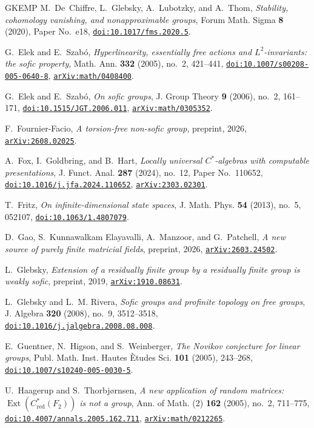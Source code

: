 \documentclass[11pt]{amsart}
\newcommand{\doi}[1]{\href{https://doi.org/#1}{\nolinkurl{doi:#1}}}
\newcommand{\arxiv}[1]{\href{https://arxiv.org/abs/#1}{\nolinkurl{arXiv:#1}}}
\theoremstyle{definition}
\theoremstyle{remark}
\theoremstyle{plain}
\begin{document}
\begin{thebibliography}{GKEMP}
M.~De~Chiffre, L.~Glebsky, A.~Lubotzky, and A.~Thom,
\emph{Stability, cohomology vanishing, and nonapproximable groups},
Forum Math. Sigma \textbf{8} (2020), Paper No.~e18,
\doi{10.1017/fms.2020.5}.

G.~Elek and E.~Szab\'o,
\emph{Hyperlinearity, essentially free actions and $L^2$-invariants:
the sofic property},
Math. Ann. \textbf{332} (2005), no.~2, 421--441,
\doi{10.1007/s00208-005-0640-8}, \arxiv{math/0408400}.

G.~Elek and E.~Szab\'o,
\emph{On sofic groups},
J. Group Theory \textbf{9} (2006), no.~2, 161--171,
\doi{10.1515/JGT.2006.011}, \arxiv{math/0305352}.

F.~Fournier-Facio,
\emph{A torsion-free non-sofic group},
preprint, 2026, \arxiv{2608.02025}.

A.~Fox, I.~Goldbring, and B.~Hart,
\emph{Locally universal $C^*$-algebras with computable presentations},
J. Funct. Anal. \textbf{287} (2024), no.~12, Paper No.~110652,
\doi{10.1016/j.jfa.2024.110652}, \arxiv{2303.02301}.

T.~Fritz,
\emph{On infinite-dimensional state spaces},
J. Math. Phys. \textbf{54} (2013), no.~5, 052107,
\doi{10.1063/1.4807079}.

D.~Gao, S.~Kunnawalkam Elayavalli, A.~Manzoor, and G.~Patchell,
\emph{A new source of purely finite matricial fields},
preprint, 2026, \arxiv{2603.24502}.

L.~Glebsky,
\emph{Extension of a residually finite group by a residually finite
group is weakly sofic},
preprint, 2019, \arxiv{1910.08631}.

L.~Glebsky and L.~M. Rivera,
\emph{Sofic groups and profinite topology on free groups},
J. Algebra \textbf{320} (2008), no.~9, 3512--3518,
\doi{10.1016/j.jalgebra.2008.08.008}.

E.~Guentner, N.~Higson, and S.~Weinberger,
\emph{The Novikov conjecture for linear groups},
Publ. Math. Inst. Hautes \`Etudes Sci. \textbf{101} (2005), 243--268,
\doi{10.1007/s10240-005-0030-5}.

U.~Haagerup and S.~Thorbj{\o}rnsen,
\emph{A new application of random matrices:
$\operatorname{Ext}(C^*_{\mathrm{red}}(F_2))$ is not a group},
Ann. of Math. (2) \textbf{162} (2005), no.~2, 711--775,
\doi{10.4007/annals.2005.162.711}, \arxiv{math/0212265}.


\end{thebibliography}
\end{document}
